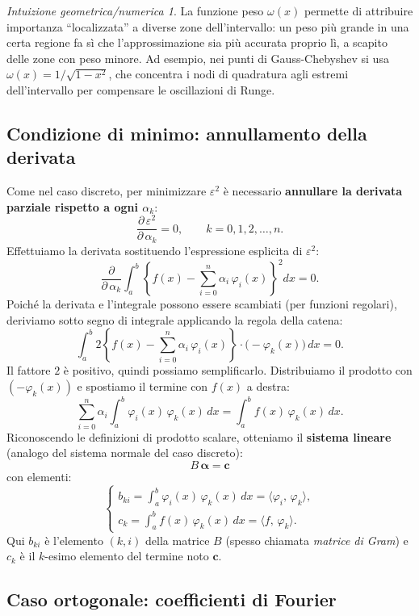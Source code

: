 \documentclass[a4paper,12pt]{article}
\theoremstyle{definition}
\theoremstyle{remark}
\newtheorem*{intuizione}{Intuizione geometrica/numerica}
\begin{document}
\begin{intuizione}
La funzione peso $\omega(x)$ permette di attribuire importanza
``localizzata'' a diverse zone dell'intervallo: un peso più grande
in una certa regione fa sì che l'approssimazione sia più accurata
proprio lì, a scapito delle zone con peso minore.
Ad esempio, nei punti di Gauss-Chebyshev si usa $\omega(x)=1/\sqrt{1-x^2}$,
che concentra i nodi di quadratura agli estremi dell'intervallo per
compensare le oscillazioni di Runge.
\end{intuizione}

\subsection{Condizione di minimo: annullamento della derivata}

Come nel caso discreto, per minimizzare $\varepsilon^2$ è necessario
\textbf{annullare la derivata parziale rispetto a ogni $\alpha_k$}:
\[
  \frac{\partial\,\varepsilon^2}{\partial\,\alpha_k} = 0,
  \qquad k = 0,1,2,\ldots,n.
\]
Effettuiamo la derivata sostituendo l'espressione esplicita di
$\varepsilon^2$:
\[
  \frac{\partial}{\partial\,\alpha_k}
  \int_a^b \left\{f(x) - \sum_{i=0}^{n}\alpha_i\,\varphi_i(x)\right\}^2 dx = 0.
\]
Poiché la derivata e l'integrale possono essere scambiati (per funzioni
regolari), deriviamo sotto segno di integrale applicando la regola della
catena:
\[
  \int_a^b 2\left\{f(x) - \sum_{i=0}^{n}\alpha_i\,\varphi_i(x)\right\}
  \cdot \bigl(-\varphi_k(x)\bigr)\,dx = 0.
\]
Il fattore $2$ è positivo, quindi possiamo semplificarlo. Distribuiamo
il prodotto con $(-\varphi_k(x))$ e spostiamo il termine con $f(x)$ a
destra:
\[
  \sum_{i=0}^{n}\alpha_i\int_a^b \varphi_i(x)\,\varphi_k(x)\,dx
  = \int_a^b f(x)\,\varphi_k(x)\,dx.
\]
Riconoscendo le definizioni di prodotto scalare, otteniamo il
\textbf{sistema lineare} (analogo del sistema normale del caso discreto):
\[
  \boxed{B\,\boldsymbol{\alpha} = \mathbf{c}}
\]
con elementi:
\[
  \begin{cases}
    b_{ki} = \displaystyle\int_a^b \varphi_i(x)\,\varphi_k(x)\,dx
            = \langle \varphi_i,\,\varphi_k \rangle, \\[8pt]
    c_k    = \displaystyle\int_a^b f(x)\,\varphi_k(x)\,dx
            = \langle f,\,\varphi_k \rangle.
  \end{cases}
\]
Qui $b_{ki}$ è l'elemento $(k,i)$ della matrice $B$ (spesso chiamata
\emph{matrice di Gram}) e $c_k$ è il $k$-esimo elemento del termine
noto $\mathbf{c}$.

\subsection{Caso ortogonale: coefficienti di Fourier}
\end{document}
